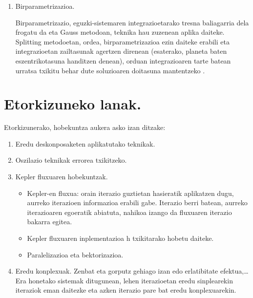 \begin{enumerate}
\item Birparametrizazioa.

Birparametrizazio, eguzki-sistemaren integrazioetarako tresna baliagarria dela frogatu da \cite{Fukushima2007,Rauch1998} eta Gauss metodoan,  teknika hau zuzenean aplika daiteke. Splitting metodoetan, ordea, birparametrizazioa ezin daiteke erabili eta integrazioetan zailtasunak agertzen direnean (esaterako, planeta baten eszentrikotasuna handitzen denean), orduan integrazioaren tarte batean urratsa txikitu behar dute soluzioaren doitasuna mantentzeko \cite{Laskar2009}.

\end{enumerate}


\section*{Etorkizuneko lanak.}


Etorkizunerako, hobekuntza aukera asko izan ditzake:
\begin{enumerate}
\item Eredu deskonposaketen aplikatutako teknikak.
\item Oszilazio teknikak errorea txikitzeko.
\item Kepler fluxuaren hobekuntzak.
\begin{itemize}
\item Kepler-en fluxua: orain iterazio guztietan hasieratik aplikatzen dugu, aurreko iterazioen informazioa erabili gabe. Iterazio berri batean, aurreko iterazioaren egoeratik abiatuta, nahikoa izango da fluxuaren iterazio bakarra egitea.
\item Kepler fluxuaren inplementazioa h txikitarako hobetu daiteke.
\item Paralelizazioa eta bektorizazioa.
\end{itemize}

\item Eredu konplexuak.
Zenbat eta gorputz gehiago izan edo erlatibitate efektua,\dots Era honetako sistemak ditugunean, lehen iterazioetan eredu sinplearekin iteraziok eman daitezke eta azken iterazio pare bat eredu konplexuarekin. 
\end{enumerate} 









